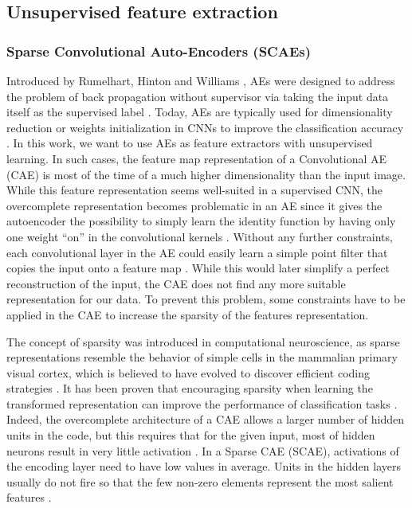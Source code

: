 \documentclass[runningheads]{llncs}
\begin{document}
\subsection{Unsupervised feature extraction}
\subsubsection{Sparse Convolutional Auto-Encoders (SCAEs)}
Introduced by Rumelhart, Hinton and Williams \cite{rumelhart1988autoencoders}, AEs were designed to address the problem of back propagation without supervisor via taking the input data itself as the supervised label \cite{baldi2012autoencoders}. Today, AEs are typically used for dimensionality reduction or weights initialization in CNNs to improve the classification accuracy \cite{masci2011stacked_cae} \cite{kohlbrenner2017pretrain_cnn}. In this work, we want to use AEs as feature extractors with unsupervised learning.
In such cases, the feature map representation of a Convolutional AE (CAE) is most of the time of a much higher dimensionality than the input image. 
While this feature representation seems well-suited in a supervised CNN, the overcomplete representation becomes problematic in an AE since it gives the autoencoder the possibility to simply learn the identity function by having only one weight “on” in the convolutional kernels \cite{masci2011stacked_cae}. 
Without any further constraints, each convolutional layer in the AE could easily learn a simple point filter that copies the input onto a feature map \cite{kohlbrenner2017pretrain_cnn}. While this would later simplify a perfect reconstruction of the input, the CAE does not find any more suitable representation for our data. To prevent this problem, some constraints have to be applied in the CAE to increase the sparsity of the features representation.

The concept of sparsity was introduced in computational neuroscience, as sparse representations resemble the behavior of simple cells in the mammalian primary visual cortex, which is believed to have evolved to discover efficient coding strategies \cite{olshausen1997sparse_coding_v1}. It has been proven that encouraging sparsity when learning the transformed representation can improve the performance of classification tasks \cite{hoyer2004sparseness}. Indeed, the overcomplete architecture of a CAE allows a larger number of hidden units in the code, but this requires that for the given input, most of hidden neurons result in very little activation \cite{ng2011sparse_ae}. 
In a Sparse CAE (SCAE), activations of the encoding layer need to have low values in average. Units in the hidden layers usually do not fire \cite{charte2018tuto_ae} so that the few non-zero elements represent the most salient features \cite{ng2011sparse_ae}.
\end{document}
